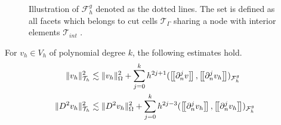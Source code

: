 \begin{figure}

\caption{Illustration of $\mathcal{F} _{h}^{g}$ denoted as the dotted lines. The set is defined as all facets which belongs to cut cells $\mathcal{T} _{\Gamma }$ sharing a node with interior elements $\mathcal{T} _{int }$ .  }
\label{fig:illustration_F_g}
\end{figure}





\begin{lemma}
    \label{lemma:bi_inv_gh_lemma}
    For $v_{h} \in  V_{h}$ of polynomial degree $k$, the following estimates hold.
        \begin{align}
            \label{eq:bi_inv_gh_1}
        \| v_h \|_{ \mathcal{T} _{h} }^{ 2 }  & \lesssim  \| v_h \|_{ \Omega  }^{ 2 }  + \sum_{j=0}^{k} h^{2j+1} ( \jump{ \partial ^{j}_{n} v }, \jump{ \partial ^{j}_{n} v_h}    )_{\mathcal{F}_{h}^{g}}\\
            \label{eq:bi_inv_gh_2}
        \| D ^2 v_h \|_{ \mathcal{T} _{h} }^{ 2 }  & \lesssim  \| D^2 v_h \|_{ \Omega  }^{ 2 }  + \sum_{j=0}^{k} h^{2j-3} ( \jump{ \partial ^{j}_{n} v_h }, \jump{ \partial ^{j}_{n}v_h }    )_{\mathcal{F}_{h}^{g}}
        \end{align}
\end{lemma}

